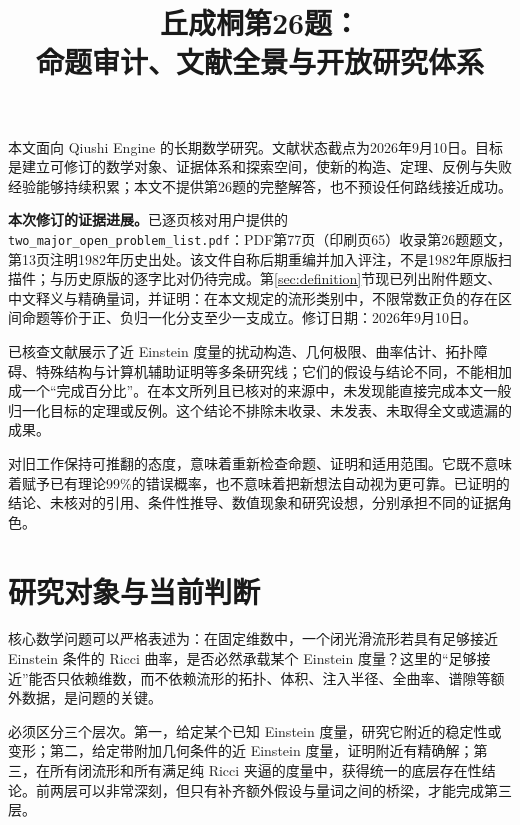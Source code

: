 \documentclass[11pt,a4paper]{article}
\title{丘成桐第26题：\\命题审计、文献全景与开放研究体系}
\author{}\date{}
\theoremstyle{definition}
\begin{document}
\maketitle
\vspace{-2em}

本文面向 Qiushi Engine 的长期数学研究。文献状态截点为2026年9月10日。目标是建立可修订的数学对象、证据体系和探索空间，使新的构造、定理、反例与失败经验能够持续积累；本文不提供第26题的完整解答，也不预设任何路线接近成功。

\textbf{本次修订的证据进展。}已逐页核对用户提供的 \texttt{two\_major\_open\_problem\_list.pdf}：PDF第77页（印刷页65）收录第26题题文，第13页注明1982年历史出处。该文件自称后期重编并加入评注，不是1982年原版扫描件；与历史原版的逐字比对仍待完成。第\ref{sec:definition}节现已列出附件题文、中文释义与精确量词，并证明：在本文规定的流形类别中，不限常数正负的存在区间命题等价于正、负归一化分支至少一支成立。修订日期：2026年9月10日。

已核查文献展示了近 Einstein 度量的扰动构造、几何极限、曲率估计、拓扑障碍、特殊结构与计算机辅助证明等多条研究线；它们的假设与结论不同，不能相加成一个“完成百分比”。在本文所列且已核对的来源中，未发现能直接完成本文一般归一化目标的定理或反例。这个结论不排除未收录、未发表、未取得全文或遗漏的成果。

对旧工作保持可推翻的态度，意味着重新检查命题、证明和适用范围。它既不意味着赋予已有理论99\%的错误概率，也不意味着把新想法自动视为更可靠。已证明的结论、未核对的引用、条件性推导、数值现象和研究设想，分别承担不同的证据角色。

\tableofcontents
\newpage

\section{研究对象与当前判断}

核心数学问题可以严格表述为：在固定维数中，一个闭光滑流形若具有足够接近 Einstein 条件的 Ricci 曲率，是否必然承载某个 Einstein 度量？这里的“足够接近”能否只依赖维数，而不依赖流形的拓扑、体积、注入半径、全曲率、谱隙等额外数据，是问题的关键。

必须区分三个层次。第一，给定某个已知 Einstein 度量，研究它附近的稳定性或变形；第二，给定带附加几何条件的近 Einstein 度量，证明附近有精确解；第三，在所有闭流形和所有满足纯 Ricci 夹逼的度量中，获得统一的底层存在性结论。前两层可以非常深刻，但只有补齐额外假设与量词之间的桥梁，才能完成第三层。
\end{document}
